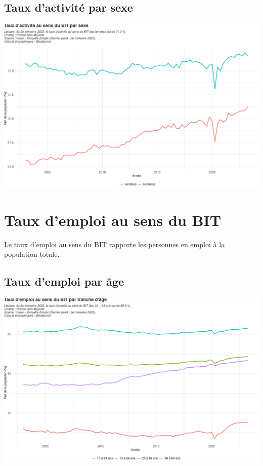\documentclass[
  paper=a4,
  ,captions=tableheading
]{scrartcl}
\begin{document}
\hypertarget{taux-dactivituxe9-par-sexe}{%
\subsection{Taux d'activité par sexe}\label{taux-dactivituxe9-par-sexe}}

\includegraphics{rapport_activite_emploi_chomage_insee_files/figure-latex/unnamed-chunk-3-1.pdf}

\newpage

\hypertarget{taux-demploi-au-sens-du-bit}{%
\section{Taux d'emploi au sens du
BIT}\label{taux-demploi-au-sens-du-bit}}

Le taux d'emploi au sens du BIT rapporte les personnes en emploi à la
population totale.

\hypertarget{taux-demploi-par-uxe2ge}{%
\subsection{Taux d'emploi par âge}\label{taux-demploi-par-uxe2ge}}

\includegraphics{rapport_activite_emploi_chomage_insee_files/figure-latex/unnamed-chunk-4-1.pdf}
\end{document}
